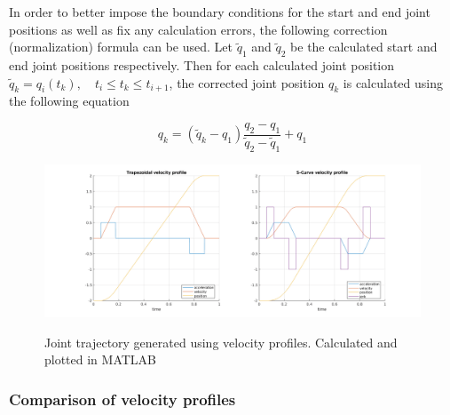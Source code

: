In order to better impose the boundary conditions for the start and end joint positions as well as fix any calculation errors, the following correction (normalization) formula can be used. 
Let $\tilde{q}_1$ and $\tilde{q}_2$ be the calculated start and end joint positions respectively. Then for each calculated joint position $\tilde{q}_k = q_i(t_k), \quad t_i \leq t_k \leq t_{i+1}$, 
the corrected joint position $q_k$ is calculated using the following equation

\begin{equation}
q_k = (\tilde{q}_k - q_1) \frac{q_2 - q_1}{\tilde{q}_2 - \tilde{q}_1} + q_1
\end{equation}


\begin{center}
\begin{figure}[htbp]
\centering
\includegraphics[width=\textwidth]{images/vel-profiles.png}\\
\caption{Joint trajectory generated using velocity profiles. Calculated and plotted in MATLAB} 
\end{figure}
\end{center}


\subsubsection{Comparison of velocity profiles}


